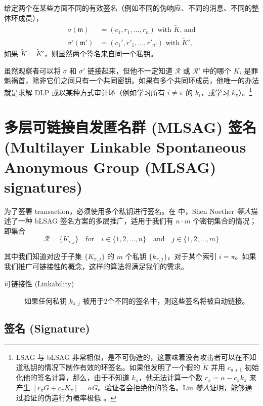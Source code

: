给定两个在某些方面不同的有效签名（例如不同的伪响应、不同的消息、不同的整体环成员），\vspace{.1cm}
\begin{align*}
	\sigma(\mathfrak{m})   &= (c_1, r_1, ..., r_n)\textrm{ with } \tilde{K}\textrm{, and}\\
	\sigma'(\mathfrak{m}')  &= (c_1', r'_1, ..., r'_{n'})\textrm{ with } \tilde{K}'\textrm{,}
\end{align*}
\quad 如果 \(\tilde{K} =  \tilde{K}'\)，则显然两个签名来自同一个私钥。

虽然观察者可以将 $\sigma$ 和 $\sigma'$ 链接起来，但他不一定知道 $\mathcal{R}$ 或 $\mathcal{R}'$ 中的哪个 $K_i$ 是罪魁祸首，除非它们之间只有一个共同密钥。如果有多个共同环成员，他唯一的办法就是求解 DLP 或以某种方式审计环（例如学习所有 $i \neq \pi$ 的 $k_i$，或学习 $k_\pi$）。\footnote{\label{lsag_unforgeable_note}LSAG 与 bLSAG 非常相似，是不可伪造的，这意味着没有攻击者可以在不知道私钥的情况下制作有效的环签名。如果他发明了一个假的 $\tilde{K}$ 并用 $c_{\pi+1}$ 初始化他的签名计算，那么，由于不知道 $k_\pi$，他无法计算一个数 $r_\pi = \alpha - c_\pi k_\pi$ 来产生 $[r_\pi G + c_\pi K_\pi] = \alpha G$。验证者会拒绝他的签名。Liu {\em 等人}证明，能够通过验证的伪造行为概率极低 \cite{Liu2004}。}



\section{多层可链接自发匿名群 (MLSAG) 签名 (Multilayer Linkable Spontaneous Anonymous Group (MLSAG) signatures)}
\label{sec:MLSAG}

为了签署 transaction，必须使用多个私钥进行签名。在 \cite{MRL-0005-ringct} 中，Shen Noether {\em 等人}描述了一种 bLSAG 签名方案的多层推广，适用于我们有 \(n \cdot m\) 个密钥集合的情况；即集合\vspace{.175cm}
\[\mathcal{R} = \{K_{i,j}\}  \quad \textrm{for} \quad  i \in \{1, 2, ..., n\} \quad \textrm{and} \quad j \in \{1, 2, ..., m\}\]

其中我们知道对应于子集 \(\{K_{\pi, j}\}\) 的 $m$ 个私钥 \(\{k_{\pi, j}\}\)，对于某个索引 \(i = \pi\)。如果我们推广可链接性的概念，这样的算法将满足我们的需求。
\begin{description}
	\item[可链接性 (Linkability)] 如果任何私钥 \(k_{\pi, j}\) 被用于2个不同的签名中，则这些签名将被自动链接。
\end{description}


\subsection*{签名 (Signature)}

